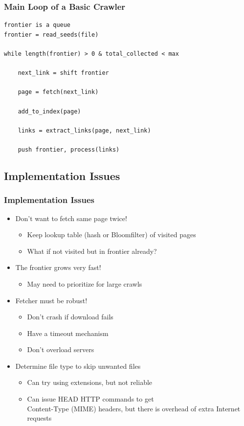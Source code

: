 \documentclass{beamer}
\begin{document}
\begin{frame}[fragile] \frametitle{Main Loop of a Basic Crawler }
 
\begin{verbatim}
frontier is a queue
frontier = read_seeds(file)

while length(frontier) > 0 & total_collected < max

    next_link = shift frontier

    page = fetch(next_link)

    add_to_index(page)

    links = extract_links(page, next_link)

    push frontier, process(links)

\end{verbatim}

\end{frame}

\subsection{Implementation Issues}

\begin{frame} \frametitle{Implementation Issues}

\begin{itemize}

\item Don't want to fetch same page twice!
\begin{itemize}
\item Keep lookup table (hash or Bloomfilter) of visited pages
\item What if not visited but in frontier already?
\end{itemize}

\item The frontier grows very fast!
\begin{itemize}
\item May need to prioritize for large crawls
\end{itemize}

\item Fetcher must be robust! 
\begin{itemize}
\item Don't crash if download fails
\item Have a timeout mechanism
\item Don't overload servers
\end{itemize}

\item Determine file type to skip unwanted files
\begin{itemize}
\item Can try using extensions, but not reliable
\item Can issue HEAD HTTP commands to get \\ Content-Type (MIME)
  headers, but there is overhead of extra Internet requests
\end{itemize}

\end{itemize}

\end{frame}
\end{document}
